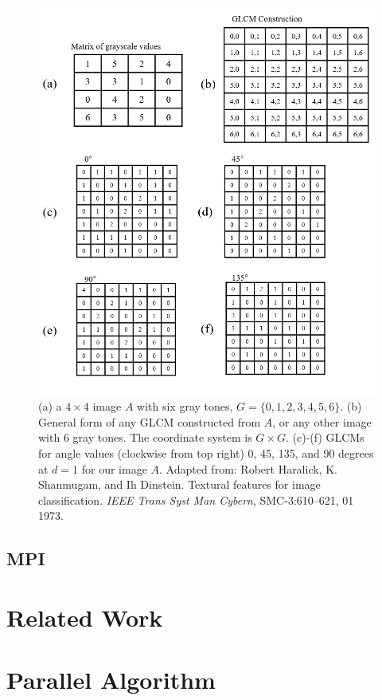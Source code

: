 \documentclass{article}
\begin{document}
    \begin{figure}[t]
      \includegraphics[width=\linewidth]{matrix_fig.PNG}
      \caption{ (a) a $4 \times 4$ image $A$ with six gray tones, $G = \{0, 1, 2, 3, 4, 5, 6\}$. (b) General form of any GLCM constructed from $A$, or any other image with 6 gray tones. The coordinate system is $G \times G$. (c)-(f) GLCMs for angle values (clockwise from top right) 0, 45, 135, and 90 degrees at $d = 1$ for our image $A$.  Adapted from: Robert Haralick, K. Shanmugam, and Ih Dinstein. Textural features for image classification. \textit{IEEE Trans Syst Man Cybern}, SMC-3:610–621, 01 1973. }
      \label{fig:matrix}
    \end{figure}
\subsection{MPI}
   
\section{Related Work}

\section{Parallel Algorithm}
\end{document}
